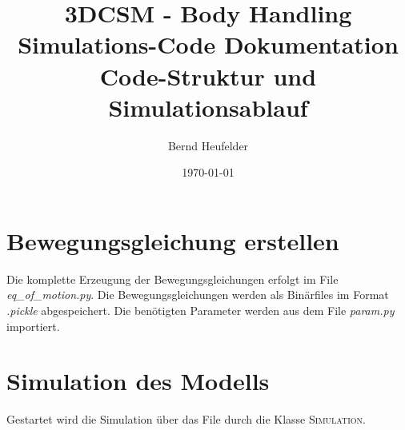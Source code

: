 \documentclass[10pt,a4paper]{article}
\title{3DCSM - Body Handling\\\normalsize Simulations-Code Dokumentation\\\small Code-Struktur und Simulationsablauf}
\author{Bernd Heufelder}
\date{\today}
\begin{document}
	\maketitle
	\newpage
	\tableofcontents
	\newpage
	\section{Bewegungsgleichung erstellen}
		Die komplette Erzeugung der Bewegungsgleichungen erfolgt im File \textit{eq\_of\_motion.py}. Die Bewegungsgleichungen werden als Binärfiles im Format \textit{.pickle} abgespeichert. Die benötigten Parameter werden aus dem File \textit{param.py} importiert.
	\section{Simulation des Modells}
		Gestartet wird die Simulation über das File  durch die Klasse \textsc{Simulation}.
\end{document}
